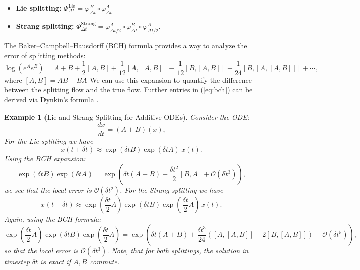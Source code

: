 \documentclass[11pt, twoside]{report}
\newtheorem{example}[theorem]{Example}
\begin{document}
\begin{itemize}
    \item \textbf{Lie splitting:} $\Phi_{\Delta t}^{\mathrm{Lie}} = \varphi^B_{\Delta t} \circ \varphi^A_{\Delta t}$
    \item \textbf{Strang splitting:} $\Phi_{\Delta t}^{\mathrm{Strang}} = \varphi^A_{\Delta t/2} \circ \varphi^B_{\Delta t} \circ \varphi^A_{\Delta t/2}$.
\end{itemize}
The Baker–Campbell–Hausdorff (BCH) formula provides a way to analyze the error of splitting methods:
\begin{equation} \label{eq:bch}
    \log \left(e^A e^B\right)=A+B+\frac{1}{2}[A, B]+\frac{1}{12}[A,[A, B]]-\frac{1}{12}[B,[A, B]]-\frac{1}{24}[B,[A,[A, B]]] + \cdots,
\end{equation}
where $[A,B] = AB-BA$
We can use this expansion to quantify the difference between the splitting flow and the true flow. Further entries in (\ref{eq:bch}) can be derived via Dynkin's formula \cite{dynkin1947}.
\begin{example}[Lie and Strang Splitting for Additive ODEs]
Consider the ODE:
\[
\frac{dx}{dt} = (A + B)(x),
\]
For the Lie splitting we have
\[
x(t+\delta t) \approx \exp(\delta t B)\exp(\delta t A)\, x(t).
\]
Using the BCH expansion:
\[
\exp(\delta t B)\exp(\delta t A) = \exp\left( \delta t (A + B) + \frac{\delta t^2}{2}[B, A] + \mathcal{O}(\delta t^3) \right),
\]
we see that the local error is $\mathcal{O}(\delta t^2)$. For the Strang splitting we have
\[
x(t+\delta t) \approx \exp\left( \frac{\delta t}{2} A \right)\exp(\delta t B)\exp\left( \frac{\delta t}{2} A \right)\, x(t).
\]
Again, using the BCH formula:
\[
\exp\left( \frac{\delta t}{2} A \right)\exp(\delta t B)\exp\left( \frac{\delta t}{2} A \right)
= \exp\left( \delta t(A + B) + \frac{\delta t^3}{24} \left( [A, [A, B]] + 2[B, [A, B]] \right) + \mathcal{O}(\delta t^5) \right),
\]
so that the local error is $\mathcal{O}(\delta t^3)$. Note, that for both splittings, the solution in timestep $\delta t$ is exact if $A,B$ commute.
\end{example}
\end{document}

